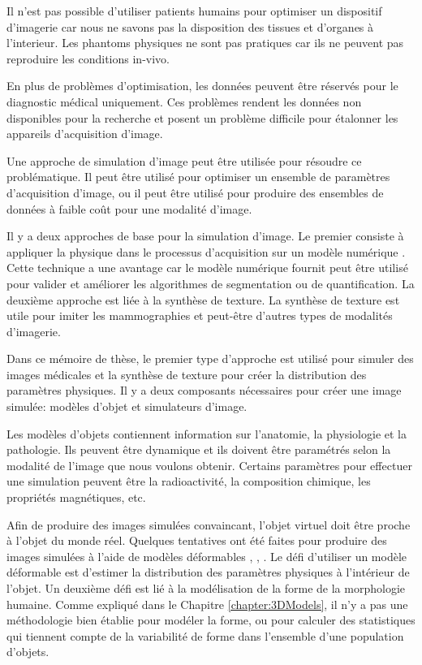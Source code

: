 Il n'est pas possible d'utiliser patients humains pour optimiser un dispositif d'imagerie car nous ne savons pas 
la disposition des tissues et d'organes à l'interieur.
Les phantoms physiques ne sont pas pratiques car ils ne peuvent pas reproduire les conditions in-vivo.

En plus de problèmes d'optimisation, les données peuvent être réservés pour le diagnostic médical uniquement.
Ces problèmes rendent les données non disponibles pour la recherche
et posent un problème difficile pour étalonner les appareils d'acquisition d'image.

Une approche de simulation d'image peut être utilisée pour résoudre ce problématique.
Il peut être utilisé pour optimiser un ensemble de paramètres d'acquisition d'image,
ou il peut être utilisé pour produire des ensembles de données à faible coût pour 
une modalité d'image.

Il y a deux approches de base pour la simulation d'image. Le premier consiste à
appliquer la physique dans le processus d'acquisition sur un modèle numérique \cite{CHAR-09}.
Cette technique a une avantage car 
le modèle numérique fournit peut être utilisé pour valider
et améliorer les algorithmes de segmentation ou de quantification.
La deuxième approche est liée à la synthèse de texture. 
La synthèse de texture est utile pour imiter les mammographies \cite{Castella:08}
et peut-être d'autres types de modalités d'imagerie.

Dans ce mémoire de thèse, le premier type d'approche est utilisé pour simuler des images médicales
et la synthèse de texture pour créer la distribution des paramètres physiques.
Il y a deux composants nécessaires pour créer une image simulée: modèles d'objet et simulateurs d'image.

Les modèles d'objets contiennent information sur l'anatomie, la physiologie et la pathologie. Ils peuvent être
dynamique et ils doivent être paramétrés selon la modalité de l'image que nous voulons obtenir.
Certains paramètres pour effectuer une simulation peuvent être
la radioactivité, la composition chimique, les propriétés magnétiques, etc.

Afin de produire des images simulées convaincant, l'objet virtuel doit être proche à l'objet du monde réel.
Quelques tentatives ont été faites pour produire des images simulées
à l'aide de modèles déformables \cite{segars2008realistic}, \cite{le2009incorporating}, \cite{tobon2011realistic}.
Le défi d'utiliser un modèle déformable est d'estimer 
la distribution des paramètres physiques à l'intérieur de l'objet. 
Un deuxième défi est lié à la modélisation de la forme de la morphologie humaine.
Comme expliqué dans le Chapitre \ref{chapter:3DModels}, il n'y a pas une 
méthodologie bien établie pour modéler la forme, ou pour calculer des statistiques qui tiennent compte de la variabilité 
de forme dans l'ensemble d'une population d'objets.


